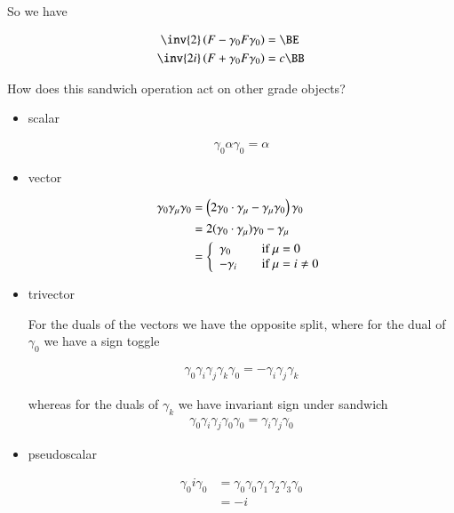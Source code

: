 So we have

\begin{align*}
\inv{2} \left(F - \gamma_0 F \gamma_0 \right) &= \BE \\
\inv{2i} \left(F + \gamma_0 F \gamma_0 \right) &= c \BB
\end{align*}

How does this sandwich operation act on other grade objects?

\begin{itemize}
\item scalar

\begin{align*}
\gamma_0 \alpha \gamma_0 = \alpha
\end{align*}

\item vector

\begin{align*}
\gamma_0 \gamma_\mu \gamma_0 
&= \left(2 \gamma_0 \cdot \gamma_\mu - \gamma_\mu \gamma_0\right) \gamma_0 \\
&= 2 (\gamma_0 \cdot \gamma_\mu) \gamma_0 - \gamma_\mu \\
&= 
\left\{
\begin{array}{l l}
\gamma_0 & \quad \mbox{if $\mu = 0$} \\
-\gamma_i & \quad \mbox{if $\mu = i \ne 0$} \\
\end{array} \right.
\end{align*}

\item trivector

For the duals of the vectors we have the opposite split, where for the dual of $\gamma_0$ we have a sign
toggle

\begin{align*}
\gamma_0 \gamma_i \gamma_j \gamma_k \gamma_0 = -\gamma_i \gamma_j \gamma_k
\end{align*}

whereas for the duals of $\gamma_k$ we have invariant sign under sandwich
\begin{align*}
\gamma_0 \gamma_i \gamma_j \gamma_0 \gamma_0 = \gamma_i \gamma_j \gamma_0
\end{align*}

\item pseudoscalar

\begin{align*}
\gamma_0 i \gamma_0 
&= \gamma_0 \gamma_0 \gamma_1 \gamma_2 \gamma_3 \gamma_0 \\
&= -i 
\end{align*}
\end{itemize}

